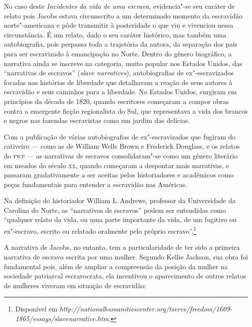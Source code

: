 No caso deste \textit{Incidentes da vida de uma escrava}, evidencia"-se seu caráter de relato pois Jacobs estava circunscrito a um determinado momento da escravidão norte"-americana e pôde transmitir à posteridade o que viu e vivenciou nessa circunstância.
É um relato, dado o seu caráter histórico, mas também uma autobiografia, pois perpassa toda a trajetória da autora, da separação dos pais para ser escravizado à emancipação no Norte.
Dentro do gênero biográfico, a narrativa ainda se inscreve na categoria, muito popular nos Estados Unidos, das ``narrativas de escravos''
(\textit{slave narratives}), autobiografias de ex"-escravizados focadas nas histórias de liberdade que detalhavam a reação de seus autores à escravidão e seus caminhos para a liberdade. No Estados Unidos, surgiram em princípios da década de 1820, quando escritores começaram a compor obras contra a emergente ficção regionalista do Sul, que representava a vida dos brancos e negros nas fazendas escravistas como um jardim das delícias.

Com a publicação de várias autobiografias de ex"-escravizados que fugiram do cativeiro --- como as de William Wells Brown e Frederick Douglass, e os relatos do \textsc{fwp} --- as narrativas de escravos consolidaram"-se como um gênero literário em meados do século \textsc{xx}, quando começaram a despontar mais narrativas, e passaram gradativamente a ser aceitas pelos historiadores e acadêmicos como peças fundamentais para entender a escravidão nas Américas.

Na definição do historiador William L.\,Andrews, professor da Universidade da Carolina do Norte, as ``narrativas de escravos'' podem ser entendidas como ``qualquer relato da vida, ou uma parte importante da vida, de um fugitivo ou ex"-escravo, escrito ou relatado oralmente pelo próprio escravo''.\footnote{Disponível em \emph{http://nationalhumanitiescenter.org/tserve/freedom/1609-1865/essays/slavenarrative.htm}.}

A narrativa de Jacobs, no entanto, tem a particularidade de ter sido a primeira narrativa de escravo escrita por uma mulher. Segundo Kellie Jackson, sua obra foi fundamental pois, além de ampliar a compreensão da posição da mulher na sociedade patriarcal escravocrata, ela incentivou o aparecimento de outros relatos de mulheres viveram em situação de escravidão:

